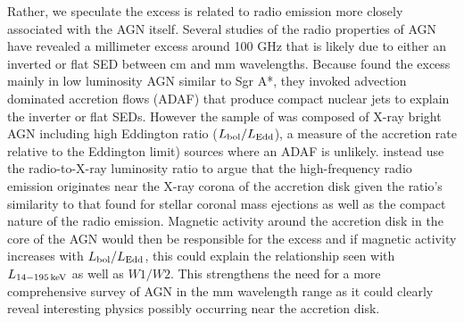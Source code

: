 Rather, we speculate the excess is related to radio emission more closely associated with the AGN itself. Several studies of the radio properties of AGN have revealed a millimeter excess around 100 GHz \citep{Doi:2005wj,Doi:2011si,Behar:2015le,Scharwachter:2015ez} that is likely due to either an inverted or flat SED between cm and mm wavelengths. Because \citet{Doi:2011si} found the excess mainly in low luminosity AGN similar to Sgr A*, they invoked advection dominated accretion flows (ADAF) that produce compact nuclear jets to explain the inverter or flat SEDs. However the sample of \citet{Behar:2015le} was composed of X-ray bright AGN including high Eddington ratio ($L_{\rm bol}/L_{\rm Edd}$), a measure of the accretion rate relative to the Eddington limit) sources where an ADAF is unlikely. \citet{Behar:2015le} instead use the radio-to-X-ray luminosity ratio to argue that the high-frequency radio emission originates near the X-ray corona of the accretion disk given the ratio's similarity to that found for stellar coronal mass ejections \citep[e.g][]{Bastian:1998tx} as well as the compact nature of the radio emission. Magnetic activity around the accretion disk in the core of the AGN would then be responsible for the excess and if magnetic activity increases with $L_{\rm bol}/L_{\rm Edd}$, this could explain the relationship seen with $L_{\rm 14-195\,keV}$ as well as $W1/W2$. This strengthens the need for a more comprehensive survey of AGN in the mm wavelength range as it could clearly reveal interesting physics possibly occurring near the accretion disk.
  
  
  
  
  